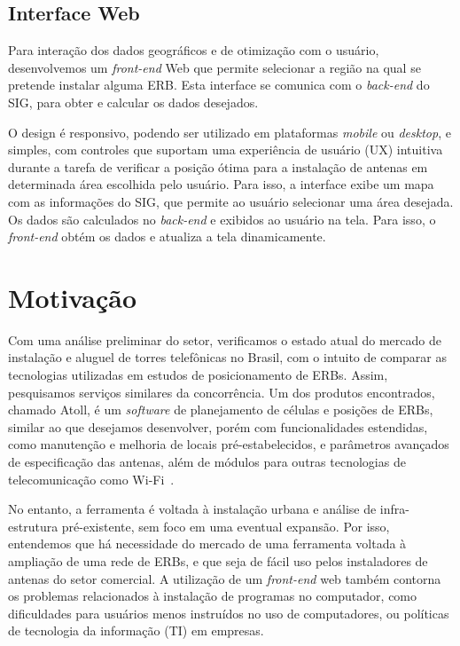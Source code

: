 \documentclass[]{politex}
\begin{document}
\subsection{Interface Web}

Para interação dos dados geográficos e de otimização com o usuário,
desenvolvemos um \textit{front-end} Web que permite selecionar a região na qual
se pretende instalar alguma ERB. Esta interface se comunica com o
\textit{back-end} do SIG, para obter e calcular os dados desejados.

O design é responsivo, podendo ser utilizado em plataformas \textit{mobile} ou
\textit{desktop}, e simples, com controles que suportam uma experiência de
usuário (UX) intuitiva durante a tarefa de verificar a posição ótima para a
instalação de antenas em determinada área escolhida pelo usuário. Para isso, a
interface exibe um mapa com as informações do SIG, que permite ao usuário
selecionar uma área desejada. Os dados são calculados no \textit{back-end} e
exibidos ao usuário na tela. Para isso, o \textit{front-end} obtém os dados e
atualiza a tela dinamicamente.

\section{Motivação}

Com uma análise preliminar do setor, verificamos o estado atual do mercado de
instalação e aluguel de torres telefônicas no Brasil, com o intuito de comparar
as tecnologias utilizadas em estudos de posicionamento de ERBs. Assim,
pesquisamos serviços similares da concorrência. Um dos produtos encontrados,
chamado Atoll, é um \textit{software} de planejamento de células e posições de
ERBs, similar ao que desejamos desenvolver, porém com funcionalidades
estendidas, como manutenção e melhoria de locais pré-estabelecidos, e parâmetros
avançados de especificação das antenas, além de módulos para outras tecnologias
de telecomunicação como Wi-Fi~\cite{atoll}.

No entanto, a ferramenta é voltada à instalação urbana e análise de
infra-estrutura pré-existente, sem foco em uma eventual expansão. Por isso,
entendemos que há necessidade do mercado de uma ferramenta voltada à ampliação
de uma rede de ERBs, e que seja de fácil uso pelos instaladores de antenas do
setor comercial. A utilização de um \textit{front-end} web também contorna os
problemas relacionados à instalação de programas no computador, como
dificuldades para usuários menos instruídos no uso de computadores, ou políticas
de tecnologia da informação (TI) em empresas.
\end{document}
